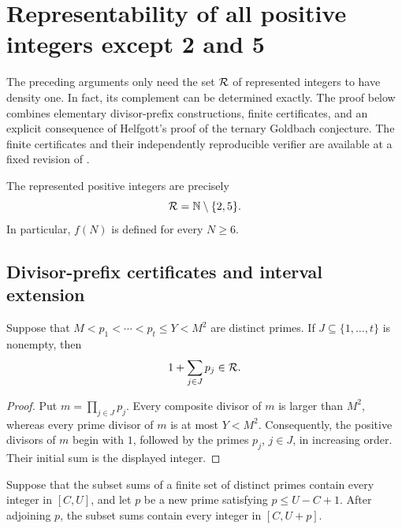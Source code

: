 



\section{Representability of all positive integers except 2 and 5}
\label{sec:fraiture}

The preceding arguments only need the set $\mathcal R$ of represented integers
to have density one.  In fact, its complement can be determined exactly.
The proof below combines elementary divisor-prefix constructions, finite
certificates, and an explicit consequence of Helfgott's proof of the ternary
Goldbach conjecture.  The finite certificates and their independently
reproducible verifier are available at a fixed revision of
\cite{FraitureVerifier}.

\begin{theorem}
\label{thm:fraiture-representability}
The represented positive integers are precisely
\[
 \mathcal R=\mathbb N\setminus\{2,5\}.
\]
In particular, $f(N)$ is defined for every $N\geq6$.
\end{theorem}

\subsection{Divisor-prefix certificates and interval extension}

\begin{lemma}
\label{lem:fraiture-prime-window}
Suppose that $M<p_1<\cdots<p_t\leq Y<M^2$ are distinct primes.  If
$J\subseteq\{1,\ldots,t\}$ is nonempty, then
\[
 1+\sum_{j\in J}p_j\in\mathcal R.
\]
\end{lemma}

\begin{proof}
Put $m=\prod_{j\in J}p_j$.  Every composite divisor of $m$ is larger than
$M^2$, whereas every prime divisor of $m$ is at most $Y<M^2$.
Consequently, the positive divisors of $m$ begin with $1$, followed by the
primes $p_j$, $j\in J$, in increasing order.  Their initial sum is the
displayed integer.
\end{proof}

\begin{lemma}
\label{lem:fraiture-extension}
Suppose that the subset sums of a finite set of distinct primes contain
every integer in $[C,U]$, and let $p$ be a new prime satisfying
$p\leq U-C+1$.  After adjoining $p$, the subset sums contain every integer
in $[C,U+p]$.
\end{lemma}

